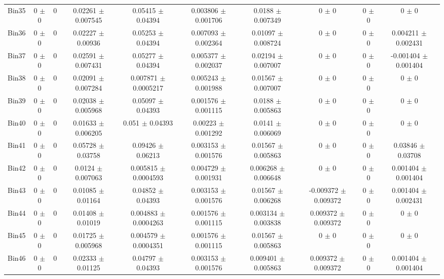 \begin{tabular}{@{\extracolsep{4pt}}lccccccccc@{}}
     Bin35 & 0 $\pm$ 0 & 0 & 0.02261 $\pm$ 0.007545 & 0.05415 $\pm$ 0.04394 & 0.003806 $\pm$ 0.001706 & 0.0188 $\pm$ 0.007349 & 0 $\pm$ 0 & 0 $\pm$ 0 & 0 $\pm$ 0 \\ 
     Bin36 & 0 $\pm$ 0 & 0 & 0.02227 $\pm$ 0.00936 & 0.05253 $\pm$ 0.04394 & 0.007093 $\pm$ 0.002364 & 0.01097 $\pm$ 0.008724 & 0 $\pm$ 0 & 0 $\pm$ 0 & 0.004211 $\pm$ 0.002431 \\ 
     Bin37 & 0 $\pm$ 0 & 0 & 0.02591 $\pm$ 0.007431 & 0.05277 $\pm$ 0.04394 & 0.005377 $\pm$ 0.002037 & 0.02194 $\pm$ 0.007007 & 0 $\pm$ 0 & 0 $\pm$ 0 & -0.001404 $\pm$ 0.001404 \\ 
     Bin38 & 0 $\pm$ 0 & 0 & 0.02091 $\pm$ 0.007284 & 0.007871 $\pm$ 0.0005217 & 0.005243 $\pm$ 0.001988 & 0.01567 $\pm$ 0.007007 & 0 $\pm$ 0 & 0 $\pm$ 0 & 0 $\pm$ 0 \\ 
     Bin39 & 0 $\pm$ 0 & 0 & 0.02038 $\pm$ 0.005968 & 0.05097 $\pm$ 0.04393 & 0.001576 $\pm$ 0.001115 & 0.0188 $\pm$ 0.005863 & 0 $\pm$ 0 & 0 $\pm$ 0 & 0 $\pm$ 0 \\ 
     Bin40 & 0 $\pm$ 0 & 0 & 0.01633 $\pm$ 0.006205 & 0.051 $\pm$ 0.04393 & 0.00223 $\pm$ 0.001292 & 0.0141 $\pm$ 0.006069 & 0 $\pm$ 0 & 0 $\pm$ 0 & 0 $\pm$ 0 \\ 
     Bin41 & 0 $\pm$ 0 & 0 & 0.05728 $\pm$ 0.03758 & 0.09426 $\pm$ 0.06213 & 0.003153 $\pm$ 0.001576 & 0.01567 $\pm$ 0.005863 & 0 $\pm$ 0 & 0 $\pm$ 0 & 0.03846 $\pm$ 0.03708 \\ 
     Bin42 & 0 $\pm$ 0 & 0 & 0.0124 $\pm$ 0.007063 & 0.005815 $\pm$ 0.0004593 & 0.004729 $\pm$ 0.001931 & 0.006268 $\pm$ 0.006648 & 0 $\pm$ 0 & 0 $\pm$ 0 & 0.001404 $\pm$ 0.001404 \\ 
     Bin43 & 0 $\pm$ 0 & 0 & 0.01085 $\pm$ 0.01164 & 0.04852 $\pm$ 0.04393 & 0.003153 $\pm$ 0.001576 & 0.01567 $\pm$ 0.006268 & -0.009372 $\pm$ 0.009372 & 0 $\pm$ 0 & 0.001404 $\pm$ 0.002431 \\ 
     Bin44 & 0 $\pm$ 0 & 0 & 0.01408 $\pm$ 0.01019 & 0.004883 $\pm$ 0.0004263 & 0.001576 $\pm$ 0.001115 & 0.003134 $\pm$ 0.003838 & 0.009372 $\pm$ 0.009372 & 0 $\pm$ 0 & 0 $\pm$ 0 \\ 
     Bin45 & 0 $\pm$ 0 & 0 & 0.01725 $\pm$ 0.005968 & 0.004579 $\pm$ 0.0004351 & 0.001576 $\pm$ 0.001115 & 0.01567 $\pm$ 0.005863 & 0 $\pm$ 0 & 0 $\pm$ 0 & 0 $\pm$ 0 \\ 
     Bin46 & 0 $\pm$ 0 & 0 & 0.02333 $\pm$ 0.01125 & 0.04797 $\pm$ 0.04393 & 0.003153 $\pm$ 0.001576 & 0.009401 $\pm$ 0.005863 & 0.009372 $\pm$ 0.009372 & 0 $\pm$ 0 & 0.001404 $\pm$ 0.001404 \\ 

\end{tabular}
